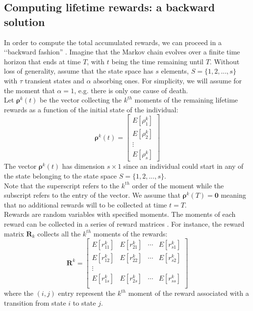 \documentclass[\main/main.tex]{subfiles}
\begin{document}
\subsection{Computing lifetime rewards: a backward solution}\label{sec:backward_solution}
In order to compute the total accumulated rewards, we can proceed in a \lq\lq backward fashion'' \citep{Caswell2011, Howard1960}. Imagine that the Markov chain evolves over a finite time horizon that ends at time $T$, with $t$ being the time remaining until $T$. Without loss of generality, assume that the state space has $s$ elements, $S=\{1,2,...,s\}$ with $\tau$ transient states and $\alpha$ absorbing ones. For simplicity, we will assume for the moment that $\alpha =1$, e.g. there is only one cause of death.\\

Let $\bm{\rho}^k(t)$ be the vector collecting the $k^{th}$ moments of the remaining lifetime rewards as a function of the initial state of the individual:
\begin{equation}
\bm{\rho}^{k}(t) =
\begin{bmatrix}
E[\rho^k_1]\\
E[\rho^k_2]\\
\vdots\\
E[\rho^k_{s}]
\end{bmatrix}
\end{equation}
The vector $\bm{\rho}^k(t)$ has dimension $s \times 1$ since an individual could start in any of the state belonging to the state space $S = \{1,2,..., s\}$.\\ Note that the superscript refers to the $k^{th}$ order of the moment while the subscript refers to the entry of the vector.
We assume that $\bm{\rho}^k(T) = \bm{0}  $  meaning that no additional rewards will to be collected at time $t=T$.\\

Rewards are random variables with specified moments. The moments of each reward can be collected in a series of reward matrices \citep{Caswell2018}. For instance, the reward matrix $\mathbf{R}_k$ collects all the $k^{th}$ moments of the rewards:
\begin{equation}
 \bm{R}^{k} = 
 \begin{bmatrix}
  E[r^k_{11}]  &  E[r^k_{21}]  & \cdots &  E[r^k_{s1}] \\
E[r^k_{12}]  &  E[r^k_{22}]  & \cdots &  E[r^k_{s2}] \\
\vdots & & &\\
  E[r^k_{1s}]  &  E[r^k_{2s}]  & \cdots &  E[r^k_{ss}] \\
 \end{bmatrix}
\end{equation}
where the $(i,j)$ entry represent the $k^{th}$ moment of the reward associated with a transition from state $i$ to state $j$.\\
\end{document}

